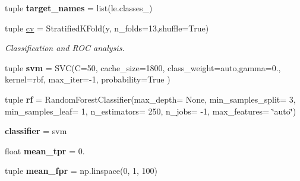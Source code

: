 \begin{DoxyCompactItemize}
\item 
\hypertarget{namespacefeat__extract_1_1plot__roc_a84f6476739a6a3ca3c76c8e19c3747fd}{}tuple {\bfseries target\+\_\+names} = list(le.\+classes\+\_\+)\label{namespacefeat__extract_1_1plot__roc_a84f6476739a6a3ca3c76c8e19c3747fd}

\item 
\hypertarget{namespacefeat__extract_1_1plot__roc_a85ad22b6e77fcb3d02aebed7a2e87dfa}{}tuple \hyperlink{namespacefeat__extract_1_1plot__roc_a85ad22b6e77fcb3d02aebed7a2e87dfa}{cv} = Stratified\+K\+Fold(y, n\+\_\+folds=13,shuffle=True)\label{namespacefeat__extract_1_1plot__roc_a85ad22b6e77fcb3d02aebed7a2e87dfa}

\begin{DoxyCompactList}\small\item\em Classification and R\+O\+C analysis. \end{DoxyCompactList}\item 
\hypertarget{namespacefeat__extract_1_1plot__roc_afdef0a520b9ebb15b45da337aceb3bf7}{}tuple {\bfseries svm} = S\+V\+C(C=50, cache\+\_\+size=1800, class\+\_\+weight=\textquotesingle{}auto\textquotesingle{},gamma=0., kernel=\textquotesingle{}rbf\textquotesingle{}, max\+\_\+iter=-\/1, probability=True )\label{namespacefeat__extract_1_1plot__roc_afdef0a520b9ebb15b45da337aceb3bf7}

\item 
\hypertarget{namespacefeat__extract_1_1plot__roc_adb2ab7075148fd88c66821eb8f075c88}{}tuple {\bfseries rf} = Random\+Forest\+Classifier(max\+\_\+depth= None, min\+\_\+samples\+\_\+split= 3, min\+\_\+samples\+\_\+leaf= 1, n\+\_\+estimators= 250, n\+\_\+jobs= -\/1, max\+\_\+features= \char`\"{}auto\char`\"{})\label{namespacefeat__extract_1_1plot__roc_adb2ab7075148fd88c66821eb8f075c88}

\item 
\hypertarget{namespacefeat__extract_1_1plot__roc_a1e6ae6d06e350847f09607dc65c305d9}{}{\bfseries classifier} = svm\label{namespacefeat__extract_1_1plot__roc_a1e6ae6d06e350847f09607dc65c305d9}

\item 
\hypertarget{namespacefeat__extract_1_1plot__roc_aed65812b350cced2aa313e8a122f76f5}{}float {\bfseries mean\+\_\+tpr} = 0.\label{namespacefeat__extract_1_1plot__roc_aed65812b350cced2aa313e8a122f76f5}

\item 
\hypertarget{namespacefeat__extract_1_1plot__roc_a29f1476a33f42904715444d586d50f6a}{}tuple {\bfseries mean\+\_\+fpr} = np.\+linspace(0, 1, 100)\label{namespacefeat__extract_1_1plot__roc_a29f1476a33f42904715444d586d50f6a}


\end{DoxyCompactItemize}
